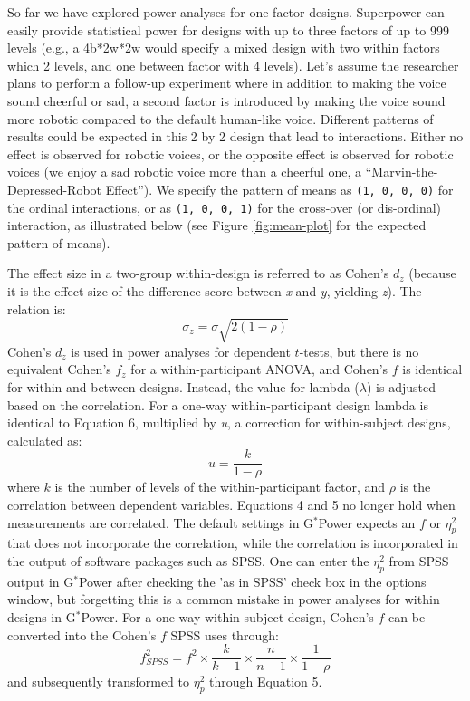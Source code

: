 \documentclass[
  english,
  ,jou,floatsintext]{apa6}
\begin{document}
So far we have explored power analyses for one factor designs.
Superpower can easily provide statistical power for designs with up to three factors of up to 999 levels (e.g., a 4b*2w*2w would specify a mixed design with two within factors which 2 levels, and one between factor with 4 levels).
Let's assume the researcher plans to perform a follow-up experiment where in addition to making the voice sound cheerful or sad, a second factor is introduced by making the voice sound more robotic compared to the default human-like voice.
Different patterns of results could be expected in this 2 by 2 design that lead to interactions.
Either no effect is observed for robotic voices, or the opposite effect is observed for robotic voices (we enjoy a sad robotic voice more than a cheerful one, a \enquote{Marvin-the-Depressed-Robot Effect}).
We specify the pattern of means as \texttt{(1,\ 0,\ 0,\ 0)} for the ordinal interactions, or as \texttt{(1,\ 0,\ 0,\ 1)} for the cross-over (or dis-ordinal) interaction, as illustrated below (see Figure \ref{fig:mean-plot} for the expected pattern of means).

\begin{tcolorbox}[colback=black!5!white,colframe=white!5!black,title=Box 2. Formula for effect sizes for within designs]
The effect size in a two-group within-design is referred to as Cohen's $d_z$ (because it is the effect size of the difference score between \emph{x} and \emph{y}, yielding \emph{z}). The relation is:
\begin{equation}
\sigma_{z}=\sigma\sqrt{2(1-\rho)}
\end{equation}
Cohen's $d_z$ is used in power analyses for dependent $t$-tests, but there is no equivalent Cohen's $f_z$ for a within-participant ANOVA, and Cohen's $f$ is identical for within and between designs. 
Instead, the value for lambda ($\lambda$) is adjusted based on the correlation. 
For a one-way within-participant design lambda is identical to Equation 6, multiplied by \textit{u}, a correction for within-subject designs, calculated as:
\begin{equation}
u = \frac{k}{1-\rho}
\end{equation}
where $k$ is the number of levels of the within-participant factor, and $\rho$ is the correlation between dependent variables.
Equations 4 and 5 no longer hold when measurements are correlated.
The default settings in G$^{*}$Power expects an $f$ or $\eta_p^2$ that does not incorporate the correlation, while the correlation is incorporated in the output of software packages such as SPSS. 
One can  enter the $\eta_p^2$ from SPSS output in G$^{*}$Power after checking the 'as in SPSS' check box in the options window, but forgetting this is a common mistake in power analyses for within designs in G$^{*}$Power.
For a one-way within-subject design, Cohen's $f$ can be converted into the Cohen's $f$ SPSS uses through:
\begin{equation}
f^2_{SPSS} = f^2 \times \frac{k}{k-1} \times \frac{n}{n-1} \times \frac{1}{1-\rho}
\end{equation}
and subsequently transformed to $\eta_p^2$ through Equation 5.
\end{tcolorbox}
\end{document}
